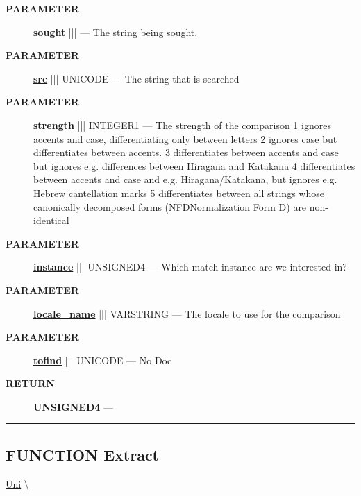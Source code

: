 \par
\begin{description}
\item [\colorbox{tagtype}{\color{white} \textbf{\textsf{PARAMETER}}}] \textbf{\underline{sought}} |||  --- The string being sought.
\item [\colorbox{tagtype}{\color{white} \textbf{\textsf{PARAMETER}}}] \textbf{\underline{src}} ||| UNICODE --- The string that is searched
\item [\colorbox{tagtype}{\color{white} \textbf{\textsf{PARAMETER}}}] \textbf{\underline{strength}} ||| INTEGER1 --- The strength of the comparison 1 ignores accents and case, differentiating only between letters 2 ignores case but differentiates between accents. 3 differentiates between accents and case but ignores e.g. differences between Hiragana and Katakana 4 differentiates between accents and case and e.g. Hiragana/Katakana, but ignores e.g. Hebrew cantellation marks 5 differentiates between all strings whose canonically decomposed forms (NFDNormalization Form D) are non-identical
\item [\colorbox{tagtype}{\color{white} \textbf{\textsf{PARAMETER}}}] \textbf{\underline{instance}} ||| UNSIGNED4 --- Which match instance are we interested in?
\item [\colorbox{tagtype}{\color{white} \textbf{\textsf{PARAMETER}}}] \textbf{\underline{locale\_name}} ||| VARSTRING --- The locale to use for the comparison
\item [\colorbox{tagtype}{\color{white} \textbf{\textsf{PARAMETER}}}] \textbf{\underline{tofind}} ||| UNICODE --- No Doc
\end{description}







\par
\begin{description}
\item [\colorbox{tagtype}{\color{white} \textbf{\textsf{RETURN}}}] \textbf{UNSIGNED4} --- 
\end{description}




\rule{\linewidth}{0.5pt}
\subsection*{\textsf{\colorbox{headtoc}{\color{white} FUNCTION}
Extract}}

\hypertarget{ecldoc:uni.extract}{}
\hspace{0pt} \hyperlink{ecldoc:Uni}{Uni} \textbackslash 

